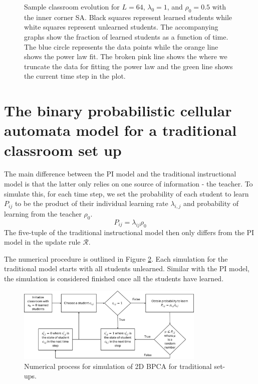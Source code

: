 \begin{figure}[htbp!]
    \caption{Sample classroom evolution for $L=64$, $\lambda_0 = 1$, and $\rho_0 = 0.5$ with the inner corner SA. Black squares represent learned students while white squares represent unlearned students. The accompanying graphs show the fraction of learned students as a function of time. The blue circle represents the data points while the orange line shows the power law fit. The broken pink line shows the where we truncate the data for fitting the power law and the green line shows the current time step in the plot.}
    \label{fig:Sample classroom evolution}
 \end{figure}

\section{The binary probabilistic cellular automata model for a traditional classroom set up}
The main difference between the PI model and the traditional instructional model is that the latter only relies on one source of information - the teacher. To simulate this, for each time step, we set the probability of each student to learn $P_{ij}$ to be the product of their individual learning rate $\lambda_{i,j}$ and probability of learning from the teacher $\rho_{0}$. 
\begin{equation}
    \label{eq:BPCA traditional learning probability}
        P_{ij} = \lambda_{ij} \rho_{0}
\end{equation}
The five-tuple of the traditional instructional model then only differs from the PI model in the update rule $\mathcal{R}$.

The numerical procedure is outlined in Figure \ref{fig:2DBPCA Traditional Flowchart}. Each simulation for the traditional model starts with all students unlearned. Similar with the PI model, the simulation is considered finished once all the students have learned.

\begin{figure}[htbp!]
    \centering
    \includegraphics[width=0.8\textwidth]{figures/2DBPCA TI Flowchart.png}
    \caption[Traditional instruction flowchart]{Numerical process for simulation of 2D BPCA for traditional set-ups.}
    \label{fig:2DBPCA Traditional Flowchart}
\end{figure}

